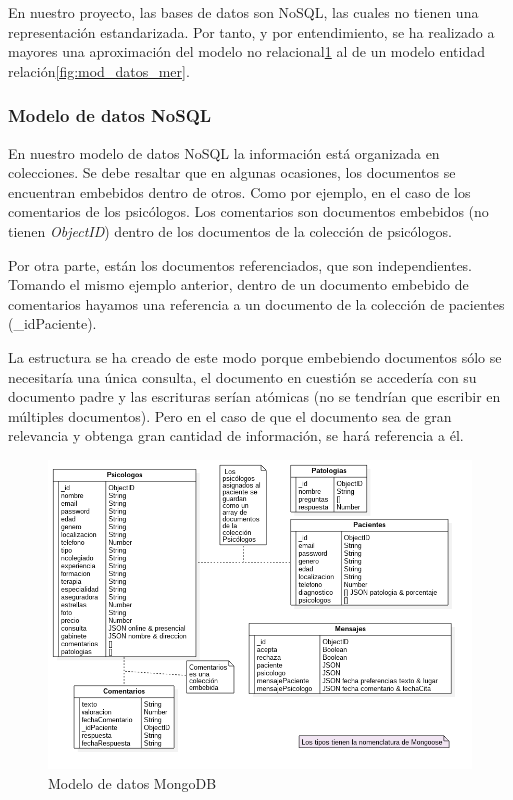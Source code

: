 En nuestro proyecto, las bases de datos son NoSQL, las cuales no tienen una representación estandarizada. Por tanto, y por entendimiento, se ha realizado a mayores una aproximación del modelo no relacional\ref{fig:mod_datos_mongoDB} al de un modelo entidad relación\ref{fig:mod_datos_mer}.

\subsubsection{Modelo de datos NoSQL}
En nuestro modelo de datos NoSQL la información está organizada en colecciones. Se debe resaltar que en algunas ocasiones, los documentos se encuentran embebidos dentro de otros. Como por ejemplo, en el caso de los comentarios de los psicólogos. Los comentarios son documentos embebidos (no tienen \textit{ObjectID}) dentro de los documentos de la colección de psicólogos.


Por otra parte, están los documentos referenciados, que son independientes. Tomando el mismo ejemplo anterior, dentro de un documento embebido de comentarios hayamos una referencia a un documento de la colección de pacientes (\_idPaciente).


La estructura se ha creado de este modo porque embebiendo documentos sólo se necesitaría una única consulta, el documento en cuestión se accedería con su documento padre y las escrituras serían atómicas (no se tendrían que escribir en múltiples documentos). Pero en el caso de que el documento sea de gran relevancia y obtenga gran cantidad de información, se hará referencia a él.


\begin{figure}[htbp] 
    \centering
    \includegraphics[width=1\textwidth]{figuras/bbdd_mod_mongoDB.png}
    \caption{Modelo de datos MongoDB}
    \label{fig:mod_datos_mongoDB}
\end{figure}	

